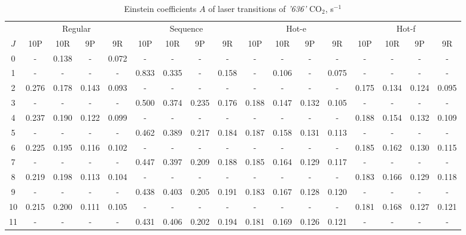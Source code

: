 \documentclass{report}
\begin{document}
\begin{appendices}
\begin{sidewaystable}
\centering
\caption{Einstein coefficients $A$ of laser transitions of \textit{'636'} {CO$_2$}, s$^{-1}$}
\label{table:A636}
\scriptsize
\begin{tabular}{|c|cccc|cccc|cccc|cccc|}
\hline
& \multicolumn{4}{c|}{Regular}& \multicolumn{4}{c|}{Sequence}& \multicolumn{4}{c|}{Hot-e}& \multicolumn{4}{c|}{Hot-f}\\
$J$ & 10P & 10R & 9P & 9R & 10P & 10R & 9P & 9R & 10P & 10R & 9P & 9R & 10P & 10R & 9P & 9R\\ 
\hline
0  &   -   & 0.138 &   -   & 0.072 &   -   &   -   &   -   &   -   &   -   &   -   &   -   &   -   &   -   &   -   &   -   &   -  \\
1  &   -   &   -   &   -   &   -   & 0.833 & 0.335 &   -   & 0.158 &   -   & 0.106 &   -   & 0.075 &   -   &   -   &   -   &   -  \\
2  & 0.276 & 0.178 & 0.143 & 0.093 &   -   &   -   &   -   &   -   &   -   &   -   &   -   &   -   & 0.175 & 0.134 & 0.124 & 0.095\\
3  &   -   &   -   &   -   &   -   & 0.500 & 0.374 & 0.235 & 0.176 & 0.188 & 0.147 & 0.132 & 0.105 &   -   &   -   &   -   &   -  \\
4  & 0.237 & 0.190 & 0.122 & 0.099 &   -   &   -   &   -   &   -   &   -   &   -   &   -   &   -   & 0.188 & 0.154 & 0.132 & 0.109\\
5  &   -   &   -   &   -   &   -   & 0.462 & 0.389 & 0.217 & 0.184 & 0.187 & 0.158 & 0.131 & 0.113 &   -   &   -   &   -   &   -  \\
6  & 0.225 & 0.195 & 0.116 & 0.102 &   -   &   -   &   -   &   -   &   -   &   -   &   -   &   -   & 0.185 & 0.162 & 0.130 & 0.115\\
7  &   -   &   -   &   -   &   -   & 0.447 & 0.397 & 0.209 & 0.188 & 0.185 & 0.164 & 0.129 & 0.117 &   -   &   -   &   -   &   -  \\
8  & 0.219 & 0.198 & 0.113 & 0.104 &   -   &   -   &   -   &   -   &   -   &   -   &   -   &   -   & 0.183 & 0.166 & 0.129 & 0.118\\
9  &   -   &   -   &   -   &   -   & 0.438 & 0.403 & 0.205 & 0.191 & 0.183 & 0.167 & 0.128 & 0.120 &   -   &   -   &   -   &   -  \\
10 & 0.215 & 0.200 & 0.111 & 0.105 &   -   &   -   &   -   &   -   &   -   &   -   &   -   &   -   & 0.181 & 0.168 & 0.127 & 0.121\\
11 &   -   &   -   &   -   &   -   & 0.431 & 0.406 & 0.202 & 0.194 & 0.181 & 0.169 & 0.126 & 0.121 &   -   &   -   &   -   &   -  \\

\end{tabular}
\end{sidewaystable}
\end{appendices}
\end{document}
